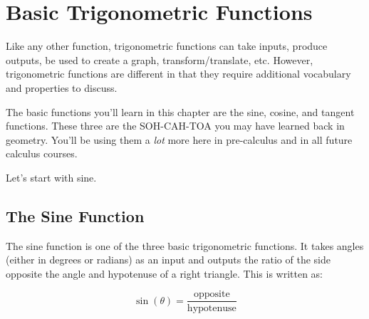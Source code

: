 \clearpage\chapter{Basic Trigonometric Functions}
Like any other function, trigonometric functions can take inputs, produce outputs, be used to create a graph, transform/translate, etc. However, trigonometric functions are different in that they require additional vocabulary and properties to discuss.

The basic functions you'll learn in this chapter are the sine, cosine, and tangent functions. These three are the SOH-CAH-TOA you may have learned back in geometry. You'll be using them a \textit{lot} more here in pre-calculus and in all future calculus courses.

Let's start with sine.
\clearpage
\section{The Sine Function}
The sine function is one of the three basic trigonometric functions. It takes angles (either in degrees or radians) as an input and outputs the ratio of the side opposite the angle and hypotenuse of a right triangle. This is written as:
\begin{center}
    \begin{minipage}[c]{0.4\linewidth}
        \centering
    \end{minipage}%
    \begin{minipage}[c]{0.2\linewidth}
        \[
            \sin(\theta) = \frac{\text{opposite}}{\text{hypotenuse}}
        \]
    \end{minipage}
\end{center}

